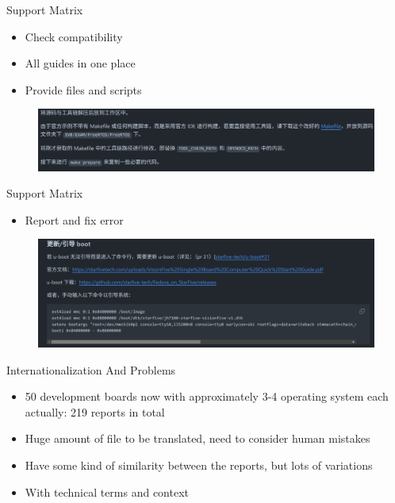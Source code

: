 \documentclass{beamer}
\begin{document}
\begin{frame}{Support Matrix}
    \begin{itemize}
        \item Check compatibility
        \item All guides in one place
        \item Provide files and scripts
    \end{itemize}
    \begin{figure}
        \centering
            \includegraphics[width=\textwidth]{pic/make_doc.png}
    \end{figure}
\end{frame}

\begin{frame}{Support Matrix}
    \begin{itemize}
        \item Report and fix error
    \end{itemize}
    \begin{figure}
        \centering
            \includegraphics[width=\textwidth]{pic/prob.png}
    \end{figure}
\end{frame}

\begin{frame}{Internationalization And Problems}
    \begin{itemize}
        \item 50 development boards now with approximately 3-4 operating system each \newline
        actually: 219 reports in total
        \item Huge amount of file to be translated, need to consider human mistakes
        \item Have some kind of similarity between the reports, but lots of variations
        \item With technical terms and context
    \end{itemize}
\end{frame}
\end{document}
